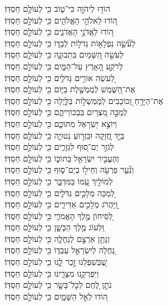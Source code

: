 \documentclass[twoside, openany, parskip=half, 11pt]{book}
\begin{document}
\begin{narrow}
הוֹד֣וּ לַיהֹוָ֣ה כִּי־ט֑וֹב \hfill
כִּ֖י לְעוֹלָ֣ם חַסְדּֽוֹ׃\\
ה֭וֹדוּ לֵאלֹהֵ֣י הָאֱלֹהִ֑ים \hfill כִּ֖י לְעוֹלָ֣ם חַסְדּֽוֹ׃\\
ה֭וֹדוּ לַאֲדֹנֵ֣י הָאֲדֹנִ֑ים \hfill כִּ֖י לְעוֹלָ֣ם חַסְדּֽוֹ׃\\
לְעֹ֘שֵׂ֤ה נִפְלָא֣וֹת גְּדֹל֣וֹת לְבַדּ֑וֹ \hfill כִּ֖י לְעוֹלָ֣ם חַסְדּֽוֹ׃\\
לְעֹשֵׂ֣ה הַ֭שָּׁמַיִם בִּתְבוּנָ֑ה \hfill כִּ֖י לְעוֹלָ֣ם חַסְדּֽוֹ׃\\
לְרֹקַ֣ע הָ֭אָרֶץ עַל־הַמָּ֑יִם \hfill כִּ֖י לְעוֹלָ֣ם חַסְדּֽוֹ׃\\
לְ֭עֹשֵׂה אוֹרִ֣ים גְּדֹלִ֑ים \hfill כִּ֖י לְעוֹלָ֣ם חַסְדּֽוֹ׃\\
אֶת־הַ֭שֶּׁמֶשׁ לְמֶמְשֶׁ֣לֶת בַּיּ֑וֹם \hfill כִּ֖י לְעוֹלָ֣ם חַסְדּֽוֹ׃\\
אֶת־הַיָּרֵ֣חַ וְ֭כוֹכָבִים \hfill\break לְמֶמְשְׁל֣וֹת בַּלָּ֑יְלָה \hfill כִּ֖י לְעוֹלָ֣ם חַסְדּֽוֹ׃\\
לְמַכֵּ֣ה מִ֭צְרַיִם בִּבְכוֹרֵיהֶ֑ם \hfill כִּ֖י לְעוֹלָ֣ם חַסְדּֽוֹ׃\\
וַיּוֹצֵ֣א יִ֭שְׂרָאֵל מִתּוֹכָ֑ם \hfill כִּ֖י לְעוֹלָ֣ם חַסְדּֽוֹ׃\\
בְּיָ֣ד חֲ֭זָקָה וּבִזְר֣וֹעַ נְטוּיָ֑ה \hfill כִּ֖י לְעוֹלָ֣ם חַסְדּֽוֹ׃\\
לְגֹזֵ֣ר יַם־ס֭וּף לִגְזָרִ֑ים \hfill כִּ֖י לְעוֹלָ֣ם חַסְדּֽוֹ׃\\
וְהֶעֱבִ֣יר יִשְׂרָאֵ֣ל בְּתוֹכ֑וֹ \hfill כִּ֖י לְעוֹלָ֣ם חַסְדּֽוֹ׃\\
וְנִ֘עֵ֤ר פַּרְעֹ֣ה וְחֵיל֣וֹ בְיַם־ס֑וּף \hfill כִּ֖י לְעוֹלָ֣ם חַסְדּֽוֹ׃\\
לְמוֹלִ֣יךְ עַ֭מּוֹ בַּמִּדְבָּ֑ר \hfill כִּ֖י לְעוֹלָ֣ם חַסְדּֽוֹ׃\\
לְ֭מַכֵּה מְלָכִ֣ים גְּדֹלִ֑ים \hfill כִּ֖י לְעוֹלָ֣ם חַסְדּֽוֹ׃\\
וַֽ֭יַּהֲרֹג מְלָכִ֣ים אַדִּירִ֑ים \hfill כִּ֖י לְעוֹלָ֣ם חַסְדּֽוֹ׃\\
לְ֭סִיחוֹן מֶ֣לֶךְ הָאֱמֹרִ֑י \hfill כִּ֖י לְעוֹלָ֣ם חַסְדּֽוֹ׃\\
וּ֭לְעוֹג מֶ֣לֶךְ הַבָּשָׁ֑ן \hfill כִּ֖י לְעוֹלָ֣ם חַסְדּֽוֹ׃\\
וְנָתַ֣ן אַרְצָ֣ם לְנַחֲלָ֑ה \hfill כִּ֖י לְעוֹלָ֣ם חַסְדּֽוֹ׃\\
נַ֭חֲלָה לְיִשְׂרָאֵ֣ל עַבְדּ֑וֹ \hfill כִּ֖י לְעוֹלָ֣ם חַסְדּֽוֹ׃\\
שֶׁ֭בְּשִׁפְלֵנוּ זָ֣כַר לָ֑נוּ \hfill כִּ֖י לְעוֹלָ֣ם חַסְדּֽוֹ׃\\
וַיִּפְרְקֵ֥נוּ מִצָּרֵ֑ינוּ \hfill כִּ֖י לְעוֹלָ֣ם חַסְדּֽוֹ׃\\
נֹתֵ֣ן לֶ֭חֶם לְכׇל־בָּשָׂ֑ר \hfill כִּ֖י לְעוֹלָ֣ם חַסְדּֽוֹ׃\\
ה֭וֹדוּ לְאֵ֣ל הַשָּׁמָ֑יִם \hfill כִּ֖י לְעוֹלָ֣ם חַסְדּֽוֹ׃\\



\end{narrow}
\end{document}
